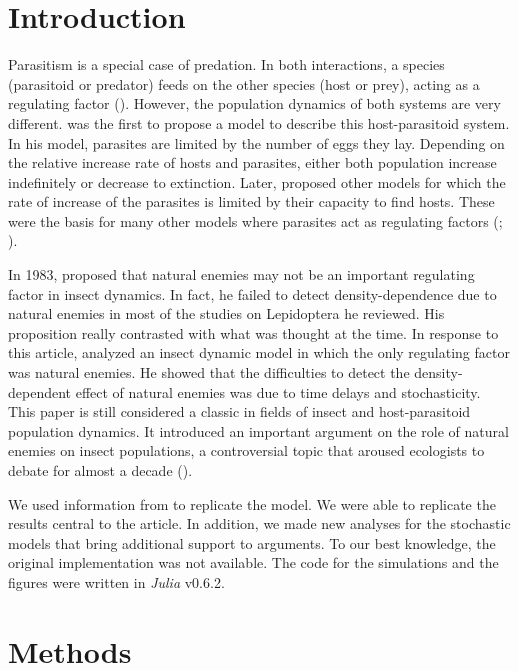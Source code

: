 \documentclass[10pt,a4paper,onecolumn]{article}
\begin{document}
\hypertarget{introduction}{%
\section{Introduction}\label{introduction}}

Parasitism is a special case of predation. In both interactions, a
species (parasitoid or predator) feeds on the other species (host or
prey), acting as a regulating factor (\textcite{Anderson78}). However,
the population dynamics of both systems are very different.
\textcite{Thompson24} was the first to propose a model to describe this
host-parasitoid system. In his model, parasites are limited by the
number of eggs they lay. Depending on the relative increase rate of
hosts and parasites, either both population increase indefinitely or
decrease to extinction. Later, \textcite{Nicholson35} proposed other
models for which the rate of increase of the parasites is limited by
their capacity to find hosts. These were the basis for many other models
where parasites act as regulating factors (\textcite{Hassell78};
\textcite{Rockwood15}).

In 1983, \textcite{Dempster83} proposed that natural enemies may not be
an important regulating factor in insect dynamics. In fact, he failed to
detect density-dependence due to natural enemies in most of the studies
on Lepidoptera he reviewed. His proposition really contrasted with what
was thought at the time. In response to this article,
\textcite{Hassell85} analyzed an insect dynamic model in which the only
regulating factor was natural enemies. He showed that the difficulties
to detect the density-dependent effect of natural enemies was due to
time delays and stochasticity. This paper is still considered a classic
in fields of insect and host-parasitoid population dynamics. It
introduced an important argument on the role of natural enemies on
insect populations, a controversial topic that aroused ecologists to
debate for almost a decade (\textcite{Turchin90}).

We used information from \textcite{Hassell85} to replicate the model. We
were able to replicate the results central to the article. In addition,
we made new analyses for the stochastic models that bring additional
support to \textcite{Hassell85} arguments. To our best knowledge, the
original implementation was not available. The code for the simulations
and the figures were written in \emph{Julia} v0.6.2.

\hypertarget{methods}{%
\section{Methods}\label{methods}}
\end{document}
